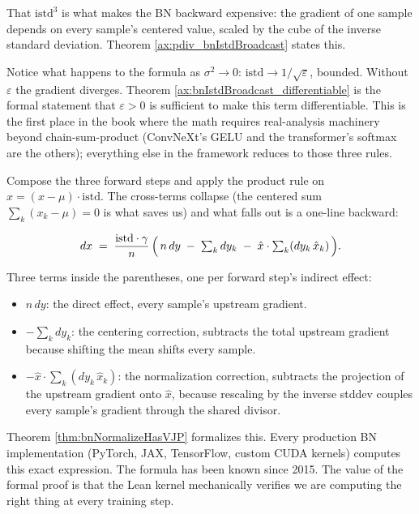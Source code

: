 That \(\mathrm{istd}^3\) is what makes the BN backward expensive:
the gradient of one sample depends on every sample's
centered value, scaled by the cube of the inverse standard
deviation. Theorem \ref{ax:pdiv_bnIstdBroadcast} states this.

Notice what happens to the formula as \(\sigma^2 \to 0\):
\(\mathrm{istd} \to 1/\sqrt{\varepsilon}\), bounded. Without \(\varepsilon\)
the gradient diverges. Theorem \ref{ax:bnIstdBroadcast_differentiable} is
the formal statement that \(\varepsilon > 0\) is sufficient to
make this term differentiable. This is the first place in
the book where the math requires real-analysis machinery beyond
chain-sum-product (ConvNeXt's GELU and the transformer's softmax are
the others); everything else in the framework reduces to those three
rules.


Compose the three forward steps and apply the product rule on
\(\hat{x} = (x - \mu) \cdot \mathrm{istd}\). The cross-terms collapse
(the centered sum \(\sum_k (x_k - \mu) = 0\) is what saves us) and
what falls out is a one-line backward:

\[
dx \;=\; \frac{\mathrm{istd} \cdot \gamma}{n}\, \Bigl(\, n\,dy
  \;-\; \textstyle\sum_k dy_k
  \;-\; \hat{x} \cdot \textstyle\sum_k (dy_k \,\hat{x}_k)\, \Bigr).
\]

Three terms inside the parentheses, one per forward step's
indirect effect:

\begin{itemize}
\item \(n\,dy\): the direct effect, every sample's upstream gradient.
\item \(-\sum_k dy_k\): the centering correction, subtracts the
  total upstream gradient because shifting the mean shifts every
  sample.
\item \(-\hat{x} \cdot \sum_k (dy_k\,\hat{x}_k)\): the normalization
  correction, subtracts the projection of the upstream gradient onto
  \(\hat{x}\), because rescaling by the inverse stddev couples
  every sample's gradient through the shared divisor.
\end{itemize}

Theorem \ref{thm:bnNormalizeHasVJP} formalizes this. Every
production BN implementation (PyTorch, JAX, TensorFlow, custom
CUDA kernels) computes this exact expression. The formula has been
known since 2015. The value of the formal proof is that the
Lean kernel mechanically verifies we are computing the right thing
at every training step.

